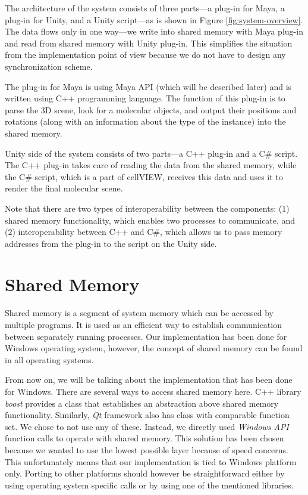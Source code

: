 \documentclass[
  digital, %
  table,   %
  nolof,     %
  nolot,     %
  oneside,
]{fithesis3}
\begin{document}
The architecture of the system consists of three parts—a plug-in for Maya, a plug-in for Unity, and a Unity script—as is shown in Figure \ref{fig:system-overview}.
The data flows only in one way—we write into shared memory with Maya plug-in and read from shared memory with Unity plug-in. This simplifies the situation from the implementation point of view because we do not have to design any synchronization scheme.

The plug-in for Maya is using Maya API (which will be described later) and is written using C++ programming language. The function of this plug-in is to parse the 3D scene, look for a molecular objects, and output their positions and rotations (along with an information about the type of the instance) into the shared memory.

Unity side of the system consists of two parts—a C++ plug-in and a C\# script. The C++ plug-in takes care of reading the data from the shared memory, while the C\# script, which is a part of cellVIEW, receives this data and uses it to render the final molecular scene.

Note that there are two types of interoperability between the components: (1) shared memory functionality, which enables two processes to communicate, and (2) interoperability between C++ and C\#, which allows us to pass memory addresses from the plug-in to the script on the Unity side.

\section{Shared Memory}
Shared memory is a segment of system memory which can be accessed by multiple programs. It is used as an efficient way to establish communication between separately running processes. Our implementation has been done for Windows operating system, however, the concept of shared memory can be found in all operating systems.

From now on, we will be talking about the implementation that has been done for Windows. There are several ways to access shared memory here. C++ library \textit{boost} provides a class that establishes an abstraction above shared memory functionality. Similarly, \textit{Qt} framework also has class with comparable function set. We chose to not use any of these. Instead, we directly used \textit{Windows API} function calls to operate with shared memory. This solution has been chosen because we wanted to use the lowest possible layer because of speed concerns. This unfortunately means that our implementation is tied to Windows platform only. Porting to other platforms should however be straightforward either by using operating system specific calls or by using one of the mentioned libraries.
\end{document}
